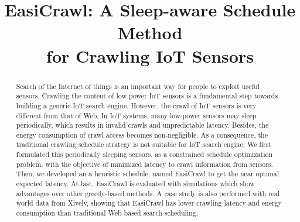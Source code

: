 \documentclass[conference]{IEEEtran}
\begin{document}
\title{EasiCrawl: A Sleep-aware Schedule Method \\for Crawling IoT Sensors}

\author{
}

\maketitle


\begin{abstract}
Search of the Internet of things is an important way for people to exploit useful sensors. Crawling the content of low power IoT sensors is a fundamental step towards building a generic IoT search engine.
However, the crawl of IoT sensors is very different from that of Web. In IoT systems, many low-power sensors may sleep periodically, which results in invalid crawls and unpredictable latency. Besides, the energy consumption of crawl access becomes non-negligible.
As a consequence, the traditional crawling schedule strategy is not suitable for IoT search engine.
We first formulated this periodically sleeping sensors, as a constrained schedule optimization problem, with the objective of minimized latency to crawl information from sensors. 
Then, we developed an a heuristic schedule, named EasiCrawl to get the near optimal expected latency. 
At last, EasiCrawl is evaluated with simulations which show advantages over other greedy-based methods.
A case study is also performed with real world data from Xively, showing that EasiCrawl has lower crawling latency and energy consumption than traditional Web-based search scheduling.
\end{abstract}

\IEEEpeerreviewmaketitle
\end{document}
